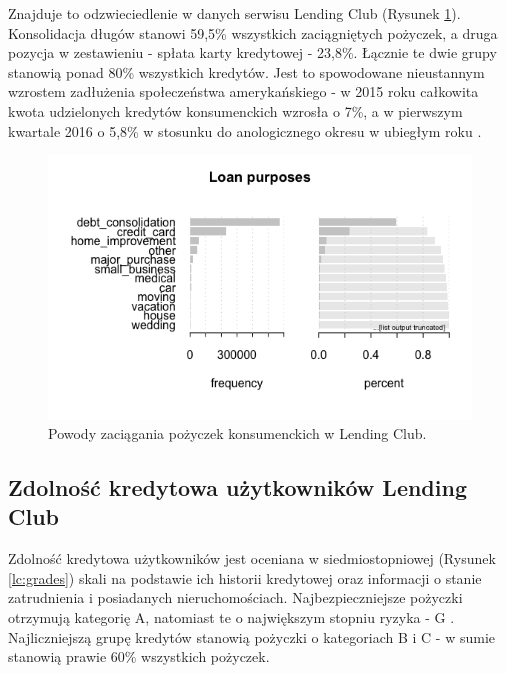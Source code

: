 Znajduje to odzwieciedlenie w danych serwisu Lending Club (Rysunek \ref{lc:purposes}). Konsolidacja długów stanowi 59,5\% wszystkich zaciągniętych pożyczek, a druga pozycja w zestawieniu - spłata karty kredytowej - 23,8\%. Łącznie te dwie grupy stanowią ponad 80\% wszystkich kredytów. Jest to spowodowane nieustannym wzrostem zadłużenia społeczeństwa amerykańskiego - w 2015 roku całkowita kwota udzielonych kredytów konsumenckich wzrosła o 7\%, a w pierwszym kwartale 2016 o 5,8\% w stosunku do anologicznego okresu w ubiegłym roku \cite{federalreserve}.

\begin{figure}[h] \centering %
	\includegraphics[scale=0.7]{img/purposes.png}
	\caption{Powody zaciągania pożyczek konsumenckich w Lending Club.}
	\label{lc:purposes}
\end{figure}

\subsection{Zdolność kredytowa użytkowników Lending Club}

Zdolność kredytowa użytkowników jest oceniana w siedmiostopniowej (Rysunek \ref{lc:grades}) skali na podstawie ich historii kredytowej oraz informacji o stanie zatrudnienia i posiadanych nieruchomościach. Najbezpieczniejsze pożyczki otrzymują kategorię A, natomiast te o największym stopniu ryzyka - G \cite{LendingClub}. Najliczniejszą grupę kredytów stanowią pożyczki o kategoriach B i C - w sumie stanowią prawie 60\% wszystkich pożyczek.

